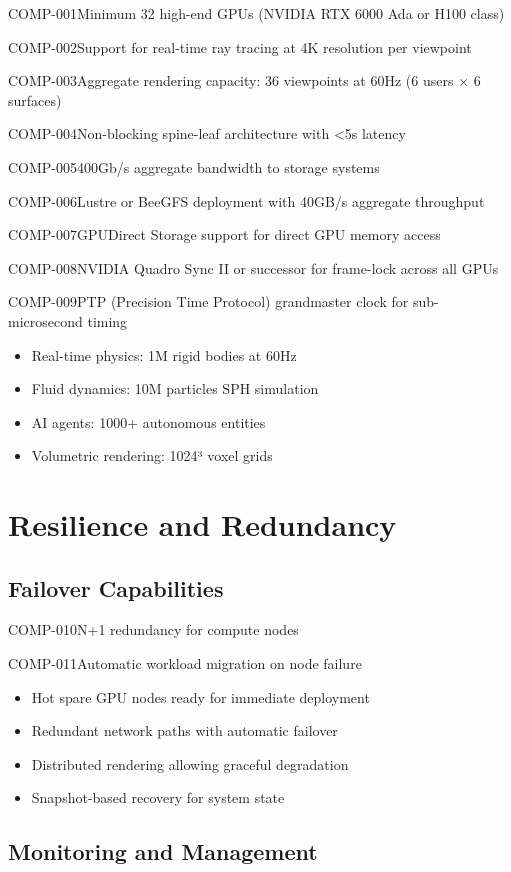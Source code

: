\begin{requirement}{COMP-001}{Minimum 32 high-end GPUs (NVIDIA RTX 6000 Ada or H100 class)}
\begin{requirement}{COMP-002}{Support for real-time ray tracing at 4K resolution per viewpoint}
\begin{requirement}{COMP-003}{Aggregate rendering capacity: 36 viewpoints at 60Hz (6 users × 6 surfaces)}
\begin{requirement}{COMP-004}{Non-blocking spine-leaf architecture with <5\textmu s latency}
\begin{requirement}{COMP-005}{400Gb/s aggregate bandwidth to storage systems}
\begin{requirement}{COMP-006}{Lustre or BeeGFS deployment with 40GB/s aggregate throughput}
\begin{requirement}{COMP-007}{GPUDirect Storage support for direct GPU memory access}
\begin{requirement}{COMP-008}{NVIDIA Quadro Sync II or successor for frame-lock across all GPUs}
\begin{requirement}{COMP-009}{PTP (Precision Time Protocol) grandmaster clock for sub-microsecond timing}
\begin{itemize}
    \item Real-time physics: 1M rigid bodies at 60Hz
    \item Fluid dynamics: 10M particles SPH simulation
    \item AI agents: 1000+ autonomous entities
    \item Volumetric rendering: 1024³ voxel grids
\end{itemize}

\section{Resilience and Redundancy}

\subsection{Failover Capabilities}

\begin{requirement}{COMP-010}{N+1 redundancy for compute nodes}

\begin{requirement}{COMP-011}{Automatic workload migration on node failure}

\begin{itemize}
    \item Hot spare GPU nodes ready for immediate deployment
    \item Redundant network paths with automatic failover
    \item Distributed rendering allowing graceful degradation
    \item Snapshot-based recovery for system state
\end{itemize}

\subsection{Monitoring and Management}


\end{requirement}
\end{requirement}
\end{requirement}
\end{requirement}
\end{requirement}
\end{requirement}
\end{requirement}
\end{requirement}
\end{requirement}
\end{requirement}
\end{requirement}

